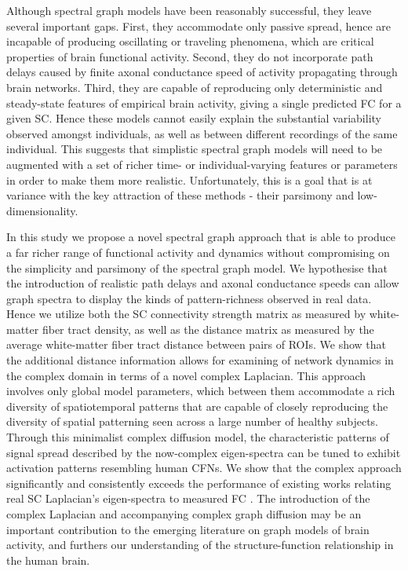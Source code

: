 \documentclass{article}
\begin{document}

Although spectral graph models have been reasonably successful, they leave several important gaps. First, they accommodate only passive spread, hence are incapable of producing oscillating or traveling phenomena, which are critical properties of brain functional activity. Second, they do not incorporate path delays caused by finite axonal conductance speed of activity propagating through brain networks. Third, they are capable of reproducing only deterministic and steady-state features of empirical brain activity, giving a single predicted FC for a given SC. Hence these models cannot easily explain the substantial variability observed amongst individuals, as well as between different recordings of the same individual. This suggests that simplistic spectral graph models will need to be augmented with a set of richer time- or individual-varying features or parameters in order to make them more realistic. Unfortunately, this is a goal that is at variance with the key attraction of these methods - their parsimony and low-dimensionality.

In this study we propose a novel spectral graph approach that is able to produce a far richer range of functional activity and dynamics without compromising on the simplicity and parsimony of the spectral graph model. We hypothesise that the introduction of realistic path delays and axonal conductance speeds can allow graph spectra to display the kinds of pattern-richness observed in real data. Hence we utilize both the SC connectivity strength matrix as measured by white-matter fiber tract density, as well as the distance matrix as measured by the average white-matter fiber tract distance between pairs of ROIs. We show that the additional distance information allows for examining of network dynamics in the complex domain in terms of a novel complex Laplacian. This approach involves only global model parameters, which between them accommodate a rich diversity of spatiotemporal patterns that are capable of closely reproducing the diversity of spatial patterning seen across a large number of healthy subjects. Through this minimalist complex diffusion model, the characteristic patterns of signal spread described by the now-complex eigen-spectra can be tuned to exhibit activation patterns resembling human CFNs. We show that the complex approach significantly and consistently exceeds the performance of existing works relating real SC Laplacian's eigen-spectra to measured FC \cite{Atasoy2016, preti_decoupling_2019, Abdelnour2018, Honey2009}. The introduction of the complex Laplacian and accompanying complex graph diffusion may be an important contribution to the emerging literature on graph models of brain activity, and furthers our understanding of the structure-function relationship in the human brain.
\end{document}

